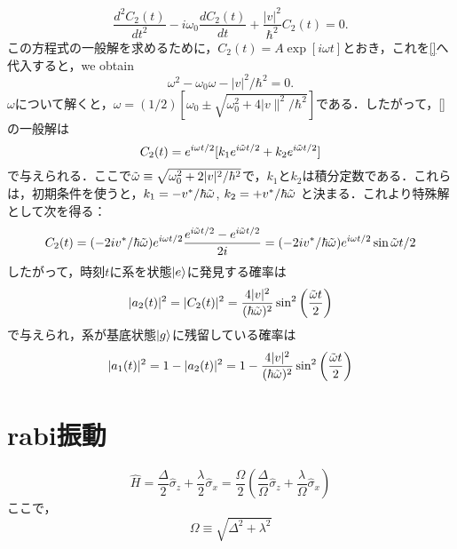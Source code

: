 \begin{equation}
    \frac{d^2C_2(t)}{dt^2}-i\omega_0\frac{dC_2(t)}{dt}+\frac{|v|^2}{\hbar^2}C_2(t)=0.
\end{equation}
この方程式の一般解を求めるために，$C_2(t)=A\exp[i\omega t]$とおき，これを\eqref{}へ代入すると，we obtain
\begin{equation}
    \omega^2-\omega_0\omega-|v|^2/\hbar^2=0.
\end{equation}
$\omega$について解くと，$\omega=(1/2)[\omega_0\pm\sqrt{\omega_0^2+4|v\|^2/\hbar^2}]$である．したがって，\eqref{}の一般解は
\begin{equation}
    C_2(t)=e^{i\omega t/2}[k_1e^{i\Tilde{\omega} t/2}+k_2e^{i\Tilde{\omega} t/2}]
\end{equation}
で与えられる．ここで$\Tilde{\omega}\equiv\sqrt{\omega_0^2+2|v|^2/\hbar^2}$で，$k_1$と$k_2$は積分定数である．これらは，初期条件を使うと，$k_1=-v^{\ast}/\hbar\Tilde{\omega}$, $k_2=+v^{\ast}/\hbar\Tilde{\omega}$
と決まる．これより特殊解として次を得る：
\begin{equation}
    C_2(t)=(-2iv^{\ast}/\hbar\Tilde{\omega})e^{i\omega t/2}\frac{e^{i\Tilde{\omega} t/2}-e^{i\Tilde{\omega} t/2}}{2i}
    =(-2iv^{\ast}/\hbar\Tilde{\omega})e^{i\omega t/2}\sin{\Tilde{\omega}t/2}
\end{equation}
したがって，時刻$t$に系を状態$\ket{e}$に発見する確率は
\begin{equation}
    |a_2(t)|^2=|C_2(t)|^2
    =\frac{4|v|^2}{(\hbar\Tilde{\omega})^2}\sin^2{\left(\frac{\Tilde{\omega}t}{2}\right)}
\end{equation}
で与えられ，系が基底状態$\ket{g}$に残留している確率は
\begin{equation}
    |a_1(t)|^2=1-|a_2(t)|^2=1-\frac{4|v|^2}{(\hbar\Tilde{\omega})^2}\sin^2{\left(\frac{\Tilde{\omega}t}{2}\right)}
\end{equation}




\section{rabi振動}

\begin{equation}
    \hat{H}=
    \frac{\Delta}{2} \hat{\sigma}_{z} + \frac{\lambda}{2} \hat{\sigma}_{x}
    =\frac{\Omega}{2}
    \left(
    \frac{\Delta}{\Omega} \hat{\sigma}_{z} + \frac{\lambda}{\Omega} \hat{\sigma}_{x}
    \right)
\end{equation}
ここで，
\begin{equation}
    \Omega\equiv \sqrt{\Delta^2 + \lambda^2}
\end{equation}


